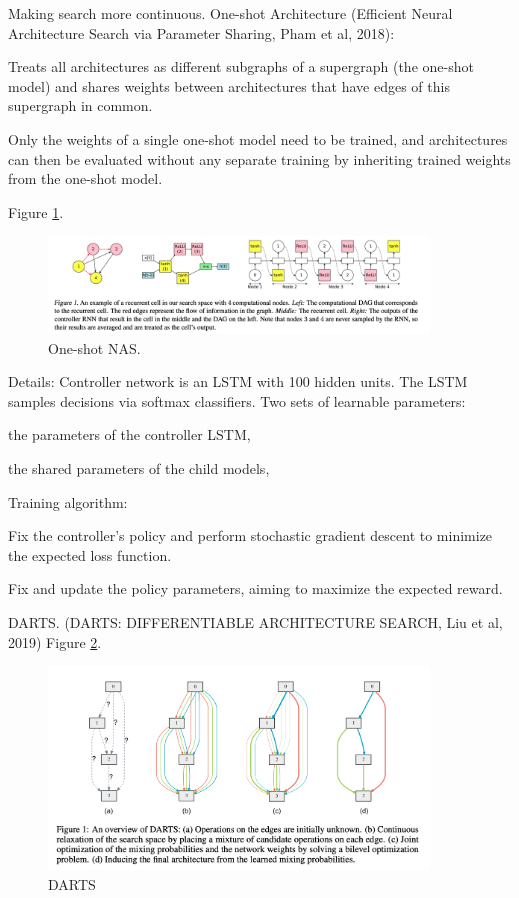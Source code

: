 \documentclass[english]{article}
\begin{document}
\item Making search more continuous. One-shot Architecture (Efficient Neural Architecture Search via Parameter Sharing, Pham et al, 2018):

Treats all architectures as different subgraphs of a supergraph (the one-shot model) and shares weights between architectures that have edges of this supergraph in common.


Only the weights of a single one-shot model need to be trained, and architectures can then be evaluated without any separate training by inheriting trained weights from the one-shot model.

\item 
Figure \ref{nas10}.


\begin{figure}[h!]
  \centering
  \includegraphics[width=0.9\textwidth]{nas10.png}
  \caption{One-shot NAS.}
  \label{nas10}
\end{figure}

\item Details: 
Controller network is an LSTM with 100 hidden units. The LSTM samples decisions via softmax classifiers. Two sets of learnable parameters:
\benum 
\item 
 the parameters of the controller LSTM, 
 \item
  the shared parameters of the child models, 
\eenum 

Training algorithm: 
\benum 
\item 
Fix the controller’s policy and perform stochastic gradient descent  to minimize the expected loss function.
 \item
Fix  and update the policy parameters, aiming to maximize the expected reward.
\eenum 



\eenum 


\item DARTS. (DARTS: DIFFERENTIABLE ARCHITECTURE SEARCH, Liu et al, 2019)
Figure \ref{darts}.


\begin{figure}[h!]
  \centering
  \includegraphics[width=0.9\textwidth]{DARTS}
  \caption{DARTS}
  \label{darts}
\end{figure}
\end{document}
